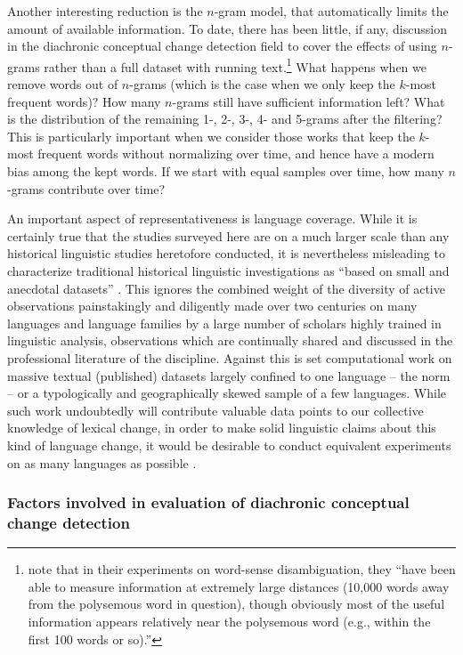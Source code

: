 \documentclass[output=paper]{langsci/langscibook}
\begin{document}
Another interesting reduction is the $n$-gram model, that automatically limits the amount of available information. To date, there has been little, if any, discussion in the diachronic conceptual change detection field to cover the effects of using $n$-grams rather than a full dataset with running text.\footnote{\citet[233]{gale-etal-1992-one} note that in their experiments on word-sense disambiguation, they ``have been able
to measure information at extremely large distances (10,000 words
away from the polysemous word in question), though obviously
most of the useful information appears relatively near the polysemous word (e.g., within the first 100 words or so).''} 
What happens when we remove words out of $n$-grams (which is the case when we only keep the $k$-most frequent words)? How many $n$-grams still have sufficient information left? What is the distribution of the remaining 1-, 2-, 3-, 4- and 5-grams after the filtering? This is particularly important when we consider those works that keep the $k$-most frequent words without normalizing over time, and hence have a modern bias among the kept words. If we start with equal samples over time, how many $n$-grams contribute over time?  

An important aspect of representativeness is language coverage. While it is certainly true that the studies surveyed here are on a
much larger scale than any historical linguistic studies heretofore
conducted, it is nevertheless misleading to characterize
traditional historical linguistic investigations as ``based on small and
anecdotal datasets'' \citep[2]{dubossarsky-2018}. This ignores the
combined weight of the diversity of active observations painstakingly
and diligently made over two centuries on many languages and language
families by a large number of scholars highly trained in linguistic
analysis, observations which are continually shared and discussed in
the professional literature of the discipline.
Against this is set computational 
work on massive textual (published) datasets largely confined to one language
-- the norm -- or a typologically and geographically skewed 
sample of a few languages. While such work undoubtedly will contribute valuable data points to our collective knowledge of lexical change, in order to make solid linguistic claims about this kind of language change, it would be desirable to conduct equivalent experiments on as many languages as possible \citep[see e.g., ][]{bender-2009,bender-2011,bender-2016}.

\subsubsection{Factors involved in evaluation of diachronic conceptual change detection}\label{sec:evaltechWSE}
\end{document}
